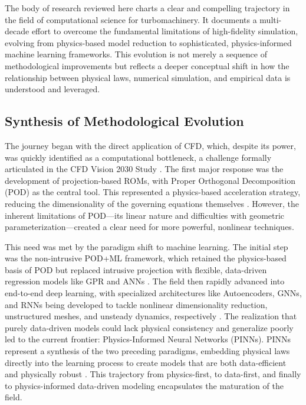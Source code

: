\documentclass[dsc, EN]{ufabcFHZh}
\begin{document}
The body of research reviewed here charts a clear and compelling trajectory in the field of computational science for turbomachinery. It documents a multi-decade effort to overcome the fundamental limitations of high-fidelity simulation, evolving from physics-based model reduction to sophisticated, physics-informed machine learning frameworks. This evolution is not merely a sequence of methodological improvements but reflects a deeper conceptual shift in how the relationship between physical laws, numerical simulation, and empirical data is understood and leveraged.

\subsection{Synthesis of Methodological Evolution}

The journey began with the direct application of CFD, which, despite its power, was quickly identified as a computational bottleneck, a challenge formally articulated in the CFD Vision 2030 Study \citep{slotnick2014cfd, park2016unstructured}. The first major response was the development of projection-based ROMs, with Proper Orthogonal Decomposition (POD) as the central tool. This represented a physics-based acceleration strategy, reducing the dimensionality of the governing equations themselves \citep{synthesized2024}. However, the inherent limitations of POD—its linear nature and difficulties with geometric parameterization—created a clear need for more powerful, nonlinear techniques.

This need was met by the paradigm shift to machine learning. The initial step was the non-intrusive POD+ML framework, which retained the physics-based basis of POD but replaced intrusive projection with flexible, data-driven regression models like GPR and ANNs \citep{synthesized2024}. The field then rapidly advanced into end-to-end deep learning, with specialized architectures like Autoencoders, GNNs, and RNNs being developed to tackle nonlinear dimensionality reduction, unstructured meshes, and unsteady dynamics, respectively \citep{synthesized2024}. The realization that purely data-driven models could lack physical consistency and generalize poorly led to the current frontier: Physics-Informed Neural Networks (PINNs). PINNs represent a synthesis of the two preceding paradigms, embedding physical laws directly into the learning process to create models that are both data-efficient and physically robust \citep{synthesized2024}. This trajectory from physics-first, to data-first, and finally to physics-informed data-driven modeling encapsulates the maturation of the field.
\end{document}
